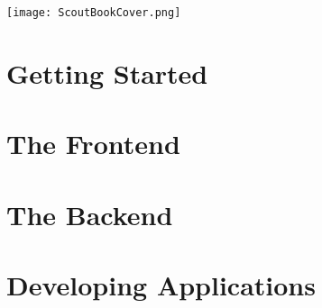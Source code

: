 \documentclass[a4paper,10pt,twoside]{book}
\begin{document}
\ifpdf
  
\else
  \texttt{[image: ScoutBookCover.png]}
\fi

\thispagestyle{empty}
\frontmatter




\pagestyle{plain}

\tableofcontents
\sloppy


\mainmatter


\pagestyle{headings}

\part{Getting Started}



\part{The Frontend}


\part{The Backend}


\part{Developing Applications}





\end{document}

